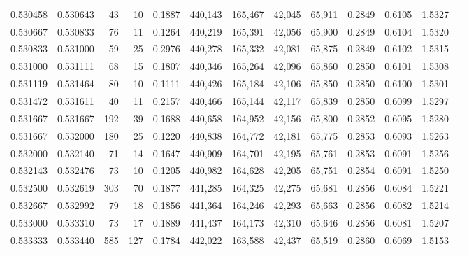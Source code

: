 \begin{tabular}{rrrrrrrrrrrrr}
0.530458 & 0.530643 &    43 &  10 &                                     0.1887 & 440,143 & 165,467 &  42,045 &  65,911 & 0.2849 & 0.6105 & 1.5327 \\
0.530667 & 0.530833 &    76 &  11 &                                     0.1264 & 440,219 & 165,391 &  42,056 &  65,900 & 0.2849 & 0.6104 & 1.5320 \\
0.530833 & 0.531000 &    59 &  25 &                                     0.2976 & 440,278 & 165,332 &  42,081 &  65,875 & 0.2849 & 0.6102 & 1.5315 \\
0.531000 & 0.531111 &    68 &  15 &                                     0.1807 & 440,346 & 165,264 &  42,096 &  65,860 & 0.2850 & 0.6101 & 1.5308 \\
0.531119 & 0.531464 &    80 &  10 &                                     0.1111 & 440,426 & 165,184 &  42,106 &  65,850 & 0.2850 & 0.6100 & 1.5301 \\
0.531472 & 0.531611 &    40 &  11 &                                     0.2157 & 440,466 & 165,144 &  42,117 &  65,839 & 0.2850 & 0.6099 & 1.5297 \\
0.531667 & 0.531667 &   192 &  39 &                                     0.1688 & 440,658 & 164,952 &  42,156 &  65,800 & 0.2852 & 0.6095 & 1.5280 \\
0.531667 & 0.532000 &   180 &  25 &                                     0.1220 & 440,838 & 164,772 &  42,181 &  65,775 & 0.2853 & 0.6093 & 1.5263 \\
0.532000 & 0.532140 &    71 &  14 &                                     0.1647 & 440,909 & 164,701 &  42,195 &  65,761 & 0.2853 & 0.6091 & 1.5256 \\
0.532143 & 0.532476 &    73 &  10 &                                     0.1205 & 440,982 & 164,628 &  42,205 &  65,751 & 0.2854 & 0.6091 & 1.5250 \\
0.532500 & 0.532619 &   303 &  70 &                                     0.1877 & 441,285 & 164,325 &  42,275 &  65,681 & 0.2856 & 0.6084 & 1.5221 \\
0.532667 & 0.532992 &    79 &  18 &                                     0.1856 & 441,364 & 164,246 &  42,293 &  65,663 & 0.2856 & 0.6082 & 1.5214 \\
0.533000 & 0.533310 &    73 &  17 &                                     0.1889 & 441,437 & 164,173 &  42,310 &  65,646 & 0.2856 & 0.6081 & 1.5207 \\
0.533333 & 0.533440 &   585 & 127 &                                     0.1784 & 442,022 & 163,588 &  42,437 &  65,519 & 0.2860 & 0.6069 & 1.5153 \\

\end{tabular}
